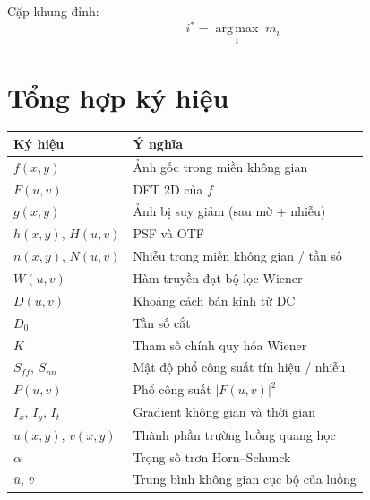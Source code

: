 \documentclass[12pt, a4paper]{article}
\begin{document}
Cặp khung đỉnh:
\begin{equation}
  i^* = \operatorname*{arg\,max}_{i}\; m_i
  \label{eq:peak_frame}
\end{equation}

\section*{Tổng hợp ký hiệu}

\begin{center}
\renewcommand{\arraystretch}{1.3}
\begin{tabular}{ll}
\hline
\textbf{Ký hiệu} & \textbf{Ý nghĩa} \\
\hline
$f(x,y)$          & Ảnh gốc trong miền không gian \\
$F(u,v)$          & DFT 2D của $f$ \\
$g(x,y)$          & Ảnh bị suy giảm (sau mờ + nhiễu) \\
$h(x,y)$, $H(u,v)$& PSF và OTF \\
$n(x,y)$, $N(u,v)$& Nhiễu trong miền không gian / tần số \\
$W(u,v)$          & Hàm truyền đạt bộ lọc Wiener \\
$D(u,v)$          & Khoảng cách bán kính từ DC \\
$D_0$             & Tần số cắt \\
$K$               & Tham số chính quy hóa Wiener \\
$S_{ff}$, $S_{nn}$& Mật độ phổ công suất tín hiệu / nhiễu \\
$P(u,v)$          & Phổ công suất $|F(u,v)|^2$ \\
$I_x$, $I_y$, $I_t$& Gradient không gian và thời gian \\
$u(x,y)$, $v(x,y)$& Thành phần trường luồng quang học \\
$\alpha$          & Trọng số trơn Horn--Schunck \\
$\bar{u}$, $\bar{v}$& Trung bình không gian cục bộ của luồng \\
\hline
\end{tabular}
\end{center}
\end{document}
